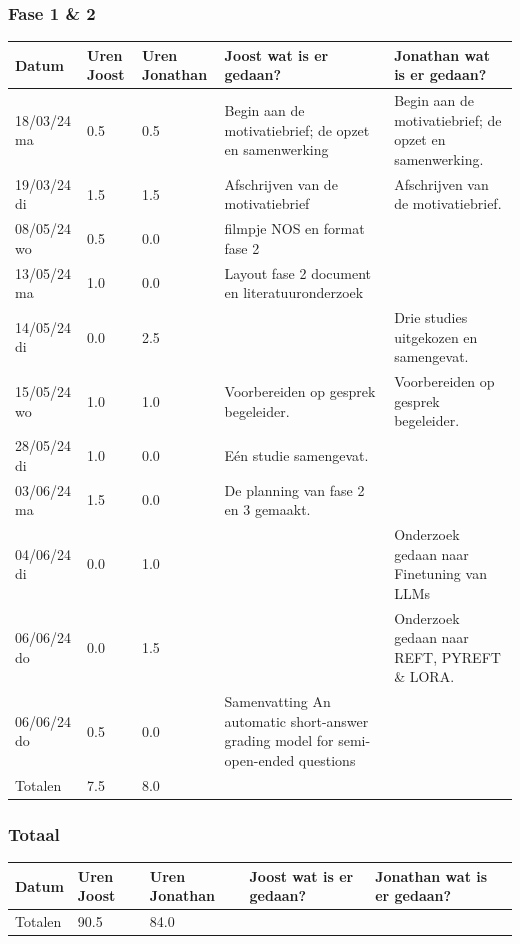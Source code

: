\documentclass[12pt]{article}
\begin{document}
\subsubsection*{Fase 1 \& 2}
\footnotesize
\begin{longtable}{@{}p{2.5cm} p{1cm} p{1.5cm} p{5cm} p{5cm}}
\toprule
Datum  & Uren Joost & Uren Jonathan & Joost wat is er gedaan? & Jonathan wat is er gedaan?  \\
\hline
\midrule
\endhead
18/03/24 ma & 0.5 & 0.5 & Begin aan de motivatiebrief; de opzet en samenwerking & Begin aan de motivatiebrief; de opzet en samenwerking. \\
19/03/24 di & 1.5 & 1.5 & Afschrijven van de motivatiebrief & Afschrijven van de motivatiebrief. \\
08/05/24 wo & 0.5 & 0.0 & filmpje NOS en format fase 2 &  \\
13/05/24 ma & 1.0 & 0.0 & Layout fase 2 document en  literatuuronderzoek &  \\
14/05/24 di & 0.0 & 2.5 &  & Drie studies uitgekozen en samengevat. \\
15/05/24 wo & 1.0 & 1.0 & Voorbereiden op gesprek begeleider. & Voorbereiden op gesprek begeleider. \\
28/05/24 di & 1.0 & 0.0 & Eén studie samengevat. &  \\
03/06/24 ma & 1.5 & 0.0 & De planning van fase 2 en 3 gemaakt. &  \\
04/06/24 di & 0.0 & 1.0 &  & Onderzoek gedaan naar Finetuning van LLMs \\
06/06/24 do & 0.0 & 1.5 &  & Onderzoek gedaan  naar REFT, PYREFT \& LORA. \\
06/06/24 do & 0.5 & 0.0 & Samenvatting An automatic short-answer grading model for semi-open-ended questions &  \\
\midrule
Totalen & 7.5 & 8.0 & & \\
\bottomrule

\end{longtable}

\normalsize
\subsubsection*{Totaal}
\footnotesize
\begin{longtable}{@{}p{2.5cm} p{1cm} p{1.5cm} p{5cm} p{5cm}}
\toprule
Datum  & Uren Joost & Uren Jonathan & Joost wat is er gedaan? & Jonathan wat is er gedaan?  \\
\endhead
\midrule
Totalen & 90.5 & 84.0 & & \\
\bottomrule

\end{longtable}

\normalsize
\end{document}
